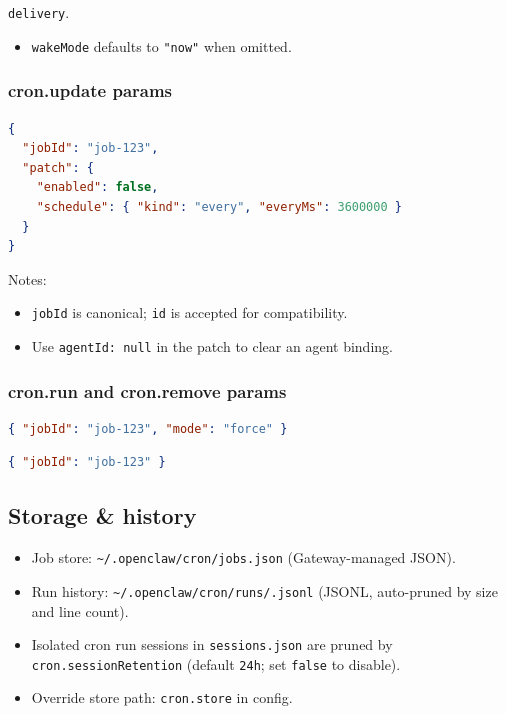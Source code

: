\texttt{delivery}.
\begin{itemize}
  \item \texttt{wakeMode} defaults to \texttt{"now"} when omitted.
\end{itemize}


\subsubsection{cron.update params}


\begin{lstlisting}[language=json]
{
  "jobId": "job-123",
  "patch": {
    "enabled": false,
    "schedule": { "kind": "every", "everyMs": 3600000 }
  }
}
\end{lstlisting}


Notes:

\begin{itemize}
  \item \texttt{jobId} is canonical; \texttt{id} is accepted for compatibility.
  \item Use \texttt{agentId: null} in the patch to clear an agent binding.
\end{itemize}


\subsubsection{cron.run and cron.remove params}


\begin{lstlisting}[language=json]
{ "jobId": "job-123", "mode": "force" }
\end{lstlisting}


\begin{lstlisting}[language=json]
{ "jobId": "job-123" }
\end{lstlisting}


\subsection{Storage \& history}


\begin{itemize}
  \item Job store: \texttt{\textasciitilde{}/.openclaw/cron/jobs.json} (Gateway-managed JSON).
  \item Run history: \texttt{\textasciitilde{}/.openclaw/cron/runs/.jsonl} (JSONL, auto-pruned by size and line count).
  \item Isolated cron run sessions in \texttt{sessions.json} are pruned by \texttt{cron.sessionRetention} (default \texttt{24h}; set \texttt{false} to disable).
  \item Override store path: \texttt{cron.store} in config.
\end{itemize}


